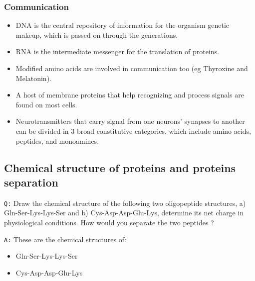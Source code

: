 \documentclass[11pt, a4paper,titlepage]{article}
\begin{document}
\subsubsection{Communication}
\label{sec-2-1-3}

\begin{itemize}
\item DNA is the central repository of information for the
  organism genetic makeup, which is passed on through the
  generations.
\item RNA is the intermediate messenger for the translation of
  proteins.
\item Modified amino acids are involved in communication too (eg Thyroxine
  and Melatonin).
\item A host of membrane proteins that help recognizing and process
  signals are found on most cells.
\item Neurotransmitters that carry signal from one neurons' synapses to
  another can be divided in 3 broad constitutive categories, which
  include amino acids, peptides, and monoamines.
\end{itemize}
\subsection{Chemical structure of proteins and proteins separation}
\label{sec-2-2}

\texttt{Q:} Draw the chemical structure of the following two oligopeptide
structures, a) Gln-Ser-Lys-Lys-Ser and b) Cys-Asp-Asp-Glu-Lys,
determine its net charge in physiological conditions. How would you
separate the two peptides ?  

\texttt{A:} These are the chemical structures of:
\begin{itemize}
\item Gln-Ser-Lys-Lys-Ser

  \setatomsep{25pt}
\item Cys-Asp-Asp-Glu-Lys

  \setatomsep{25pt}
\end{itemize}
\end{document}
